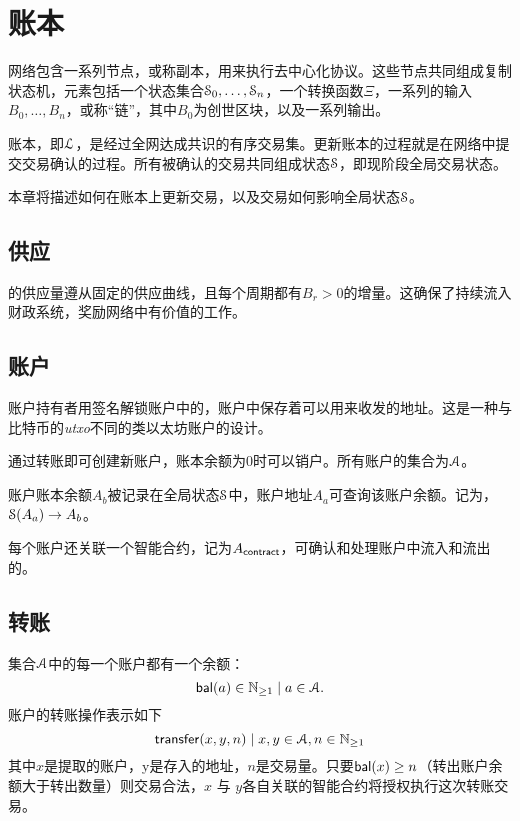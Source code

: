 \section{\oscoin{}账本}
\label{s:ledger}

\def\posnat{\mathbb{N}_{\geq 1}}

\oscoin{}网络包含一系列节点，或称副本，用来执行去中心化协议。这些节点共同组成复制状态机，元素包括一个状态集合$\mathcal{S}_0, \ldots, \mathcal{S}_n$，一个转换函数$\Xi$，一系列的输入$B_0, \ldots, B_n$，或称“链”，其中$B_0$为创世区块，以及一系列输出。

\oscoin{}账本，即$\mathcal{L}$，是经过全网达成共识的有序交易集。更新账本的过程就是在网络中提交交易确认的过程。所有被确认的交易共同组成状态$\mathcal{S}$，即现阶段全局交易状态。

本章将描述如何在账本上更新交易，以及交易如何影响全局状态$\mathcal{S}$。

\subsection{供应}
\label{s:supply}

\oscoin{}的供应量遵从固定的供应曲线，且每个周期都有$B_r > 0$的增量。这确保了\oscoin{}持续流入财政系统，奖励网络中有价值的工作。

\subsection{账户}
\label{s:accounts}

账户持有者用签名解锁账户中的\oscoin{}，账户中保存着可以用来收发\oscoin{}的地址。这是一种与比特币的\emph{utxo}不同的类以太坊账户的设计。

通过转账即可创建新账户，账本余额为0时可以销户。所有账户的集合为$\mathcal{A}$。

账户账本余额$A_b$被记录在全局状态$\mathcal{S}$中，账户地址$A_a$可查询该账户余额。记为，$\mathcal{S}(A_a) \to A_b$。

每个账户还关联一个智能合约，记为$A_{\mathsf{contract}}$，可确认和处理账户中流入和流出的\oscoin{}。

\subsection{转账\oscoin{}}
\label{s:transfering}

集合$\mathcal{A}$中的每一个账户都有一个\oscoin{}余额：
\[
    \bal(a) \in \posnat \mid a \in \accounts.
\]
账户的转账操作表示如下
\[
    \tx{transfer}{x,y,n} \mid x,y \in \accounts, n \in \posnat
\]
其中$x$是提取\oscoin{}的账户，y是\oscoin{}存入的地址，$n$是交易量。只要$\mathsf{bal}(x) \geq n$（转出账户余额大于转出数量）则交易合法，$x$ 与 $y$各自关联的智能合约将授权执行这次转账交易。

